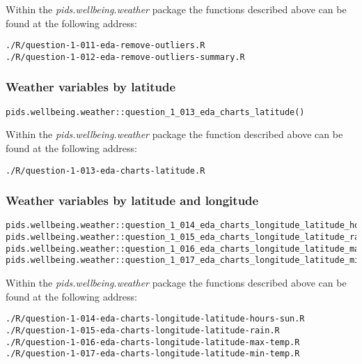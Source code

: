 \documentclass[12pt, oneside, openany]{book}
\begin{document}
Within the \emph{pids.wellbeing.weather} package the functions described above can be found at the following address:

\begin{verbatim}
./R/question-1-011-eda-remove-outliers.R
./R/question-1-012-eda-remove-outliers-summary.R
\end{verbatim}

\subsubsection*{Weather variables by latitude}

\begin{verbatim}
pids.wellbeing.weather::question_1_013_eda_charts_latitude()
\end{verbatim}

Within the \emph{pids.wellbeing.weather} package the function described above can be found at the following address:

\begin{verbatim}
./R/question-1-013-eda-charts-latitude.R
\end{verbatim}

\subsubsection*{Weather variables by latitude and longitude}

\begin{verbatim}
pids.wellbeing.weather::question_1_014_eda_charts_longitude_latitude_hours_sun()
pids.wellbeing.weather::question_1_015_eda_charts_longitude_latitude_rain()
pids.wellbeing.weather::question_1_016_eda_charts_longitude_latitude_max_temp()
pids.wellbeing.weather::question_1_017_eda_charts_longitude_latitude_min_temp()
\end{verbatim}

Within the \emph{pids.wellbeing.weather} package the functions described above can be found at the following address:

\begin{verbatim}
./R/question-1-014-eda-charts-longitude-latitude-hours-sun.R
./R/question-1-015-eda-charts-longitude-latitude-rain.R
./R/question-1-016-eda-charts-longitude-latitude-max-temp.R
./R/question-1-017-eda-charts-longitude-latitude-min-temp.R
\end{verbatim}
\end{document}
